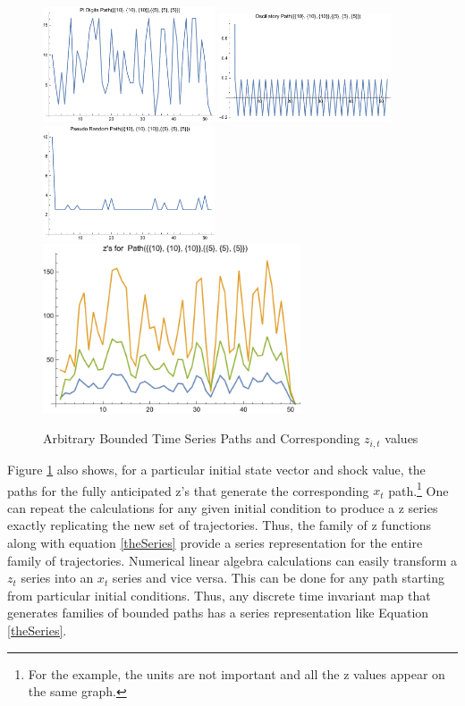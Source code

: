 \documentclass[12pt]{article}
\begin{document}
\begin{figure}
  \centering
\includegraphics[width=2in]{piPath.pdf}
\includegraphics[width=2in]{oscillPath.pdf}
\includegraphics[width=2in]{pseudoPath.pdf}
\includegraphics[width=3in]{theZs.pdf}  
  
  \caption{Arbitrary Bounded Time Series Paths and Corresponding $z_{i,t}$ values}\label{arbpaths}
\end{figure}





Figure \ref{arbpaths} also shows, for a particular initial state vector and shock value,  the paths for the  fully anticipated z's that generate the corresponding $x_t$ path.\footnote{For the example, the units are not important and all the z values appear on the same graph.}
One can repeat the calculations for any given initial condition to produce
a z series exactly replicating the new set of trajectories.  Thus, the family
of z functions along with equation \ref{theSeries} provide a series 
representation for the entire family of trajectories. Numerical linear algebra calculations can easily transform a $z_t$ series into an $x_t$ series and vice versa.  This can be done for any path starting from particular initial conditions. 
 Thus,  any discrete time invariant map that generates families of bounded paths has a series representation like Equation \ref{theSeries}.
\end{document}
